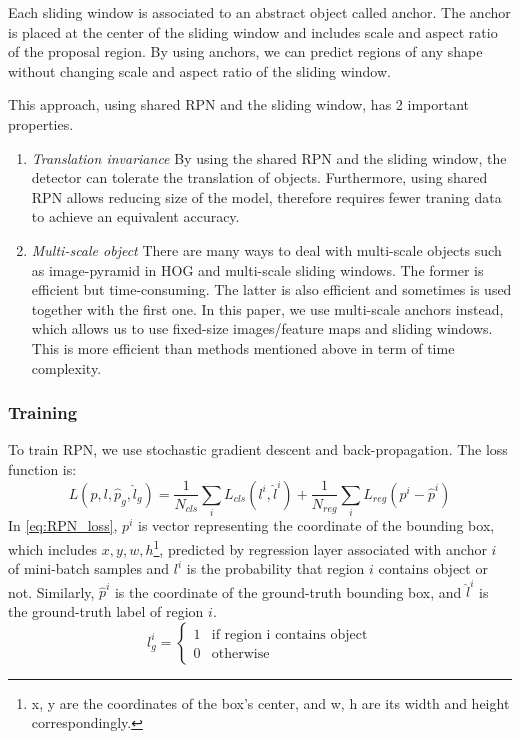 \documentclass[conference]{IEEEtran}
\begin{document}
Each sliding window is associated to an abstract object called anchor. The anchor is placed at the center of the sliding window and includes scale and aspect ratio of the proposal region. By using anchors, we can predict regions of any shape without changing scale and aspect ratio of the sliding window. 

This approach, using shared RPN and the sliding window, has 2 important properties.

\begin{enumerate}
	\item \emph{Translation invariance} By using the shared RPN and the sliding window, the detector can tolerate the translation of objects. Furthermore, using shared RPN allows reducing size of the model, therefore requires fewer traning data to achieve an equivalent accuracy.  
	\item \emph{Multi-scale object} There are many ways to deal with multi-scale objects such as image-pyramid in HOG and multi-scale sliding windows. The former is efficient but time-consuming. The latter is also efficient and sometimes is used together with the first one. In this paper, we use multi-scale anchors instead, which allows us to use fixed-size images/feature maps and sliding windows. This is more efficient than methods mentioned above in term of time complexity.
\end{enumerate}

\subsubsection{Training}
To train RPN, we use stochastic gradient descent and back-propagation. The loss function is:
\begin{equation}\label{eq:RPN_loss}
L(p, l, \hat{p}_g, \hat{l}_g) = \frac{1}{N_{cls}}\sum_{i}L_{cls}(l^i, \hat{l}^i) + \frac{1}{N_{reg}}\sum_{i} L_{reg}(p^i - \hat{p}^i)
\end{equation}
In \ref{eq:RPN_loss}, $p^i$ is vector representing the coordinate of the bounding box, which includes ${x, y, w, h}$\footnote{x, y are the coordinates of the box's center, and w, h are its width and height correspondingly.}, predicted by regression layer associated with anchor $i$ of mini-batch samples and $l^i$ is the probability that region $i$ contains object or not. Similarly, $\hat{p}^i$ is the coordinate of the ground-truth bounding box, and $\hat{l}^i$ is the ground-truth label of region $i$.
\begin{equation}
l^i_g = 
\begin{cases}
1 & \text{if region i contains object} \\
0 & \text{otherwise}
\end{cases}
\end{equation}
\end{document}
